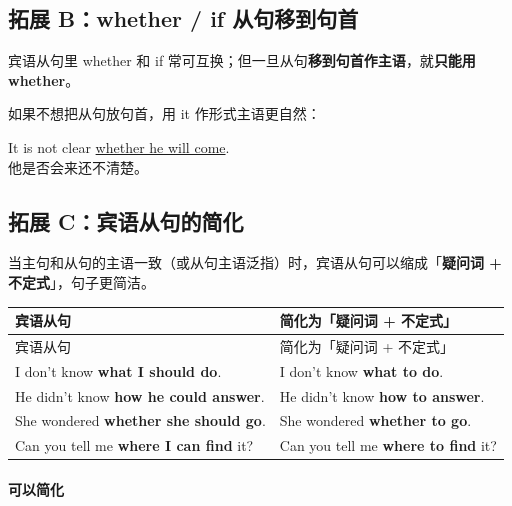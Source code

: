 \documentclass[11pt,a4paper]{ctexart}
\begin{document}
\subsection*{拓展 B：whether / if 从句移到句首}

宾语从句里 whether 和 if 常可互换；但一旦从句\textbf{移到句首作主语}，就\textbf{只能用 whether}。

\begin{center}\end{center}

如果不想把从句放句首，用 it 作形式主语更自然：

It is not clear \underline{whether he will come}.\\ 他是否会来还不清楚。

\subsection*{拓展 C：宾语从句的简化}

当主句和从句的主语一致（或从句主语泛指）时，宾语从句可以缩成「\textbf{疑问词 + 不定式}」，句子更简洁。

{\footnotesize
\begin{longtable}{p{6.70cm}p{6.70cm}}
\hline
宾语从句 & 简化为「疑问词 + 不定式」 \\
\hline
\endfirsthead
\hline
宾语从句 & 简化为「疑问词 + 不定式」 \\
\hline
\endhead
\hline
\endfoot
I don’t know \textbf{what I should do}. & I don’t know \textbf{what to do}. \\
He didn’t know \textbf{how he could answer}. & He didn’t know \textbf{how to answer}. \\
She wondered \textbf{whether she should go}. & She wondered \textbf{whether to go}. \\
Can you tell me \textbf{where I can find} it? & Can you tell me \textbf{where to find} it? \\
\end{longtable}
}

\paragraph{可以简化}
\end{document}
